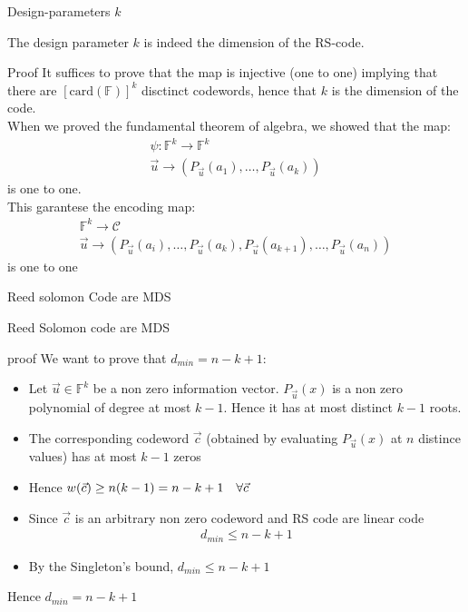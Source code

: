 \begin{parag}{Design-parameters $k$ }
    \begin{theoreme}
        The design parameter $k$ is indeed the dimension of the RS-code.
    \end{theoreme}
    \begin{subparag}{Proof}
        It suffices to prove that the map is injective (one to one) implying that there are $\left[\text{card}\left(\mathbb{F}\right)\right]^k$ disctinct codewords, hence that $k$ is the dimension of the code.\\
        When we proved the fundamental theorem of algebra, we showed that the map:
        \begin{align*} 
            \psi: \mathbb{F}^k \to \mathbb{F}^k\\
            \vec{u} \to \left(P_{\vec{u}}\left(a_{1}\right), \ldots, P_{\vec{u}}\left(a_k\right)\right)
        \end{align*}
        is one to one.\\
        This garantese the encoding map:
        \begin{align*}  
            \mathbb{F}^k \to \mathcal{C} \\
            \vec{u} \to \left(P_{\vec{u}}\left(a_i\right), \ldots, P_{\vec{u}}\left(a_k\right), P_{\vec{u}}\left(a_{k+1}\right), \ldots, P_{\vec{u}}\left(a_n\right)\right)
        \end{align*}
    is one to one
    \end{subparag}
    
\end{parag}
\begin{parag}{Reed solomon Code are MDS}
    \begin{theoreme}
        Reed Solomon code are MDS
    \end{theoreme}
    \begin{subparag}{proof}
        We want to prove that $d_{min} =  n- k + 1$:
        \begin{itemize}
            \item Let $\vec{u} \in \mathbb{F}^k$ be a non zero information vector. $P_{\vec{u}}\left(x\right)$ is a non zero polynomial of degree at most $k-1$. Hence it has at most distinct $k-1$ roots.
            \item The corresponding codeword $\vec{c}$ (obtained by evaluating $P_{\vec{u}}\left(x\right)$ at $n$ distince values) has at most $k-1$ zeros
            \item Hence $w\left(\vec{c}\right) \geq n \left(k-1\right) = n-k + 1 \mathspace \forall \vec{c}$ 
            \item Since $\vec{c}$ is an arbitrary non zero codeword and RS code are linear code
                \begin{align*} d_{min} \leq n - k  + 1 \end{align*}
            \item By the Singleton's bound, $d_{min} \leq n - k + 1$
        \end{itemize}
        Hence $d_{min} =  n-k + 1$
    \end{subparag}
\end{parag}
